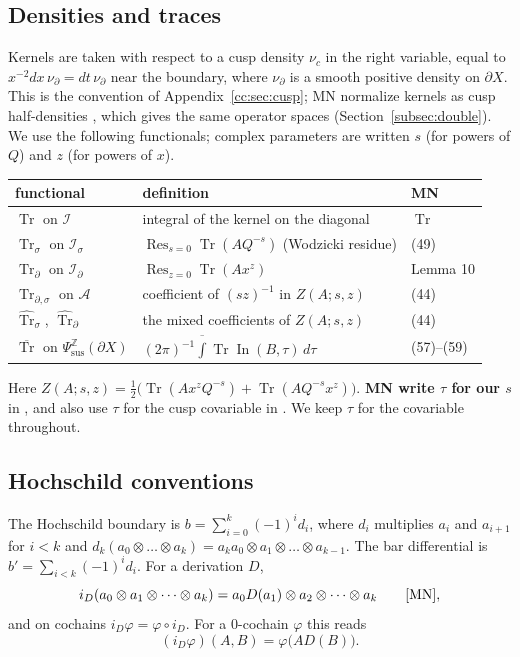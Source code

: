 \documentclass[11pt,oneside,reqno]{article}
\DeclareMathOperator{\Tr}{Tr}
\DeclareMathOperator{\In}{In}
\DeclareMathOperator{\Res}{Res}
\newcommand{\Z}{\mathbb Z}
\newcommand{\cA}{\mathcal A}
\newcommand{\cI}{\mathcal I}
\newcommand{\Is}{\mathcal I_\sigma}
\newcommand{\Id}{\mathcal I_\partial}
\newcommand{\Psis}{\Psi_{\mathrm{sus}}}
\newcommand{\Trs}{\Tr_\sigma}
\newcommand{\Trd}{\Tr_\partial}
\newcommand{\Trds}{\Tr_{\partial,\sigma}}
\newcommand{\hTrs}{\widehat{\Tr}_\sigma}
\newcommand{\hTrd}{\widehat{\Tr}_\partial}
\newcommand{\bTr}{\overline{\Tr}}
\theoremstyle{plain}
\theoremstyle{definition}
\theoremstyle{remark}
\begin{document}
\subsection{Densities and traces}\label{subsec:traces}
Kernels are taken with respect to a cusp density \(\nu_c\) in the right
variable, equal to \(x^{-2}dx\,\nu_\partial=dt\,\nu_\partial\) near the
boundary, where \(\nu_\partial\) is a smooth positive density on
\(\partial X\). This is the convention of Appendix~\ref{cc:sec:cusp}; MN
normalize kernels as cusp half-densities \cite[(118)]{MN}, which gives
the same operator spaces (Section~\ref{subsec:double}). We use
the following functionals; complex parameters are written \(s\) (for
powers of \(Q\)) and \(z\) (for powers of \(x\)).
\begin{center}
\renewcommand{\arraystretch}{1.25}
\begin{tabular}{lll}
 functional & definition & MN\\\hline
 \(\Tr\) on \(\cI\) & integral of the kernel on the diagonal & \(\Tr\)\\
 \(\Trs\) on \(\Is\) & \(\Res_{s=0}\Tr(AQ^{-s})\) (Wodzicki residue) & (49)\\
 \(\Trd\) on \(\Id\) & \(\Res_{z=0}\Tr(Ax^z)\) & Lemma 10\\
 \(\Trds\) on \(\cA\) & coefficient of \((sz)^{-1}\) in \(Z(A;s,z)\) & (44)\\
 \(\hTrs\), \(\hTrd\) & the mixed coefficients of \(Z(A;s,z)\) & (44)\\
 \(\bTr\) on \(\Psis^{\Z}(\partial X)\) &
 \((2\pi)^{-1}\overline{\int}\Tr\In(B,\tau)\,d\tau\) & (57)--(59)\\
\end{tabular}
\end{center}
Here \(Z(A;s,z)=\frac12\bigl(\Tr(Ax^zQ^{-s})+\Tr(AQ^{-s}x^z)\bigr)\).
\textbf{MN write \(\tau\) for our \(s\)} in \cite[(43)--(62)]{MN}, and also
use \(\tau\) for the cusp covariable in \cite[(139)]{MN}. We keep \(\tau\)
for the covariable throughout.

\subsection{Hochschild conventions}
The Hochschild boundary is
\(b=\sum_{i=0}^k(-1)^id_i\), where \(d_i\) multiplies \(a_i\) and
\(a_{i+1}\) for \(i<k\) and \(d_k(a_0\otimes\dots\otimes a_k)=a_ka_0\otimes
a_1\otimes\dots\otimes a_{k-1}\). The bar differential is
\(b'=\sum_{i<k}(-1)^id_i\). For a derivation \(D\),
\[
 i_D(a_0\otimes a_1\otimes\dots\otimes a_k)=a_0D(a_1)\otimes a_2\otimes
 \dots\otimes a_k \qquad\text{\cite[\S6]{MN}},
\]
and on cochains \(i_D\varphi=\varphi\circ i_D\). For a \(0\)-cochain
\(\varphi\) this reads
\[
 (i_D\varphi)(A,B)=\varphi\bigl(AD(B)\bigr).
\]
\end{document}
